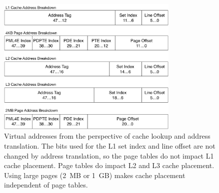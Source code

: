 \begin{figure}[hbt]
  \centering
  \includegraphics[width=87mm]{figures/caching_and_paging.pdf}
  \caption{
    Virtual addresses from the perspective of cache lookup and address
    translation. The bits used for the L1 set index and line offset are not
    changed by address translation, so the page tables do not impact L1 cache
    placement. Page tables do impact L2 and L3 cache placement. Using large
    pages (2~MB or 1~GB) makes cache placement independent of page tables.
  }
  \label{fig:caching_and_paging}
\end{figure}
